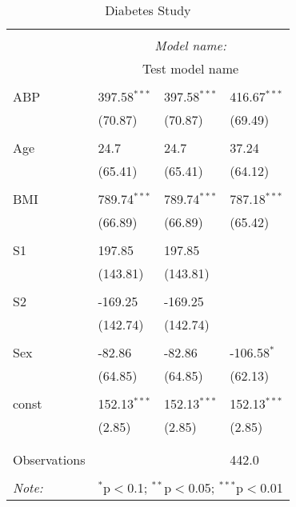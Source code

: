 \begin{table}[!htbp] \centering
  \caption{Diabetes Study}
  \label{}
\begin{tabularx}{\textwidth}{lXXX}
\\[-1.8ex]\hline
\hline \\[-1.8ex]
& \multicolumn{3}{c}{\textit{Model name:}} \
\cr \cline{3-4}
\\[-1.8ex] & \multicolumn{3}{c}{Test model name} \\\hline \\[-1.8ex]
 ABP & 397.58$^{***}$ & 397.58$^{***}$ & 416.67$^{***}$ \\
  & (70.87) & (70.87) & (69.49) \\
  & & & \\
 Age & 24.7$^{}$ & 24.7$^{}$ & 37.24$^{}$ \\
  & (65.41) & (65.41) & (64.12) \\
  & & & \\
 BMI & 789.74$^{***}$ & 789.74$^{***}$ & 787.18$^{***}$ \\
  & (66.89) & (66.89) & (65.42) \\
  & & & \\
 S1 & 197.85$^{}$ & 197.85$^{}$ & \\
  & (143.81) & (143.81) & \\
  & & & \\
 S2 & -169.25$^{}$ & -169.25$^{}$ & \\
  & (142.74) & (142.74) & \\
  & & & \\
 Sex & -82.86$^{}$ & -82.86$^{}$ & -106.58$^{*}$ \\
  & (64.85) & (64.85) & (62.13) \\
  & & & \\
 const & 152.13$^{***}$ & 152.13$^{***}$ & 152.13$^{***}$ \\
  & (2.85) & (2.85) & (2.85) \\
  & & & \\
\hline \\[-1.8ex]
 Observations &   &   & 442.0 \\
\hline
\hline \\[-1.8ex]
\textit{Note:} & \multicolumn{3}{r}{$^{*}$p$<$0.1; $^{**}$p$<$0.05; $^{***}$p$<$0.01} \\
\end{tabularx}
\end{table}